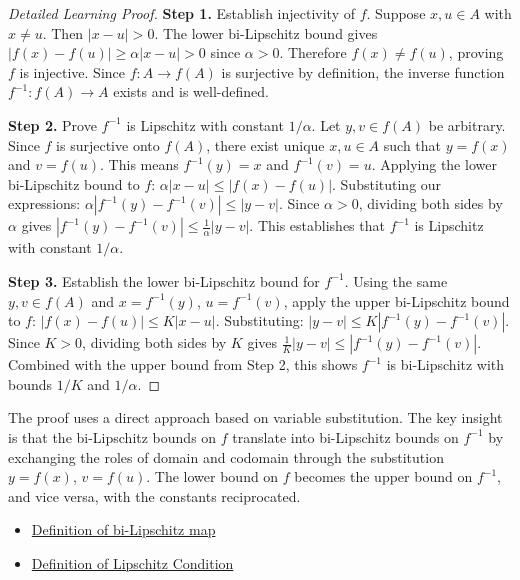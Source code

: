 \begin{proof}[Detailed Learning Proof]
\LRAProofBodyStart

\textbf{Step 1.} Establish injectivity of $f$. Suppose $x, u \in A$ with $x \neq u$. Then $|x - u| > 0$. The lower bi-Lipschitz bound gives $|f(x) - f(u)| \geq \alpha|x - u| > 0$ since $\alpha > 0$. Therefore $f(x) \neq f(u)$, proving $f$ is injective. Since $f : A \to f(A)$ is surjective by definition, the inverse function $f^{-1} : f(A) \to A$ exists and is well-defined.

\textbf{Step 2.} Prove $f^{-1}$ is Lipschitz with constant $1/\alpha$. Let $y, v \in f(A)$ be arbitrary. Since $f$ is surjective onto $f(A)$, there exist unique $x, u \in A$ such that $y = f(x)$ and $v = f(u)$. This means $f^{-1}(y) = x$ and $f^{-1}(v) = u$. Applying the lower bi-Lipschitz bound to $f$: $\alpha|x - u| \leq |f(x) - f(u)|$. Substituting our expressions: $\alpha|f^{-1}(y) - f^{-1}(v)| \leq |y - v|$. Since $\alpha > 0$, dividing both sides by $\alpha$ gives $|f^{-1}(y) - f^{-1}(v)| \leq \frac{1}{\alpha}|y - v|$. This establishes that $f^{-1}$ is Lipschitz with constant $1/\alpha$.

\textbf{Step 3.} Establish the lower bi-Lipschitz bound for $f^{-1}$. Using the same $y, v \in f(A)$ and $x = f^{-1}(y)$, $u = f^{-1}(v)$, apply the upper bi-Lipschitz bound to $f$: $|f(x) - f(u)| \leq K|x - u|$. Substituting: $|y - v| \leq K|f^{-1}(y) - f^{-1}(v)|$. Since $K > 0$, dividing both sides by $K$ gives $\frac{1}{K}|y - v| \leq |f^{-1}(y) - f^{-1}(v)|$. Combined with the upper bound from Step 2, this shows $f^{-1}$ is bi-Lipschitz with bounds $1/K$ and $1/\alpha$.
\end{proof}

\begin{remark*}
The proof uses a direct approach based on variable substitution. The key insight is that the bi-Lipschitz bounds on $f$ translate into bi-Lipschitz bounds on $f^{-1}$ by exchanging the roles of domain and codomain through the substitution $y = f(x)$, $v = f(u)$. The lower bound on $f$ becomes the upper bound on $f^{-1}$, and vice versa, with the constants reciprocated.
\end{remark*}

\begin{dependencies}
\begin{itemize}
  \item \hyperref[def:bi-lipschitz]{Definition of bi-Lipschitz map}
  \item \hyperref[def:lipschitz-condition]{Definition of Lipschitz Condition}
\end{itemize}
\end{dependencies}

\clearpage

